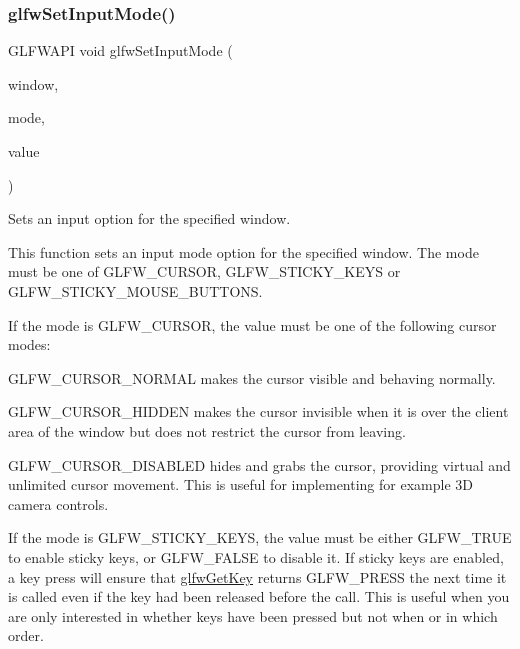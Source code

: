 \subsubsection{\texorpdfstring{glfw\+Set\+Input\+Mode()}{glfwSetInputMode()}}
{\footnotesize\ttfamily G\+L\+F\+W\+A\+PI void glfw\+Set\+Input\+Mode (\begin{DoxyParamCaption}\item[{\hyperlink{group__window_ga3c96d80d363e67d13a41b5d1821f3242}{G\+L\+F\+Wwindow} $\ast$}]{window,  }\item[{int}]{mode,  }\item[{int}]{value }\end{DoxyParamCaption})}



Sets an input option for the specified window. 

This function sets an input mode option for the specified window. The mode must be one of {\ttfamily G\+L\+F\+W\+\_\+\+C\+U\+R\+S\+OR}, {\ttfamily G\+L\+F\+W\+\_\+\+S\+T\+I\+C\+K\+Y\+\_\+\+K\+E\+YS} or {\ttfamily G\+L\+F\+W\+\_\+\+S\+T\+I\+C\+K\+Y\+\_\+\+M\+O\+U\+S\+E\+\_\+\+B\+U\+T\+T\+O\+NS}.

If the mode is {\ttfamily G\+L\+F\+W\+\_\+\+C\+U\+R\+S\+OR}, the value must be one of the following cursor modes\+:
\begin{DoxyItemize}
\item {\ttfamily G\+L\+F\+W\+\_\+\+C\+U\+R\+S\+O\+R\+\_\+\+N\+O\+R\+M\+AL} makes the cursor visible and behaving normally.
\item {\ttfamily G\+L\+F\+W\+\_\+\+C\+U\+R\+S\+O\+R\+\_\+\+H\+I\+D\+D\+EN} makes the cursor invisible when it is over the client area of the window but does not restrict the cursor from leaving.
\item {\ttfamily G\+L\+F\+W\+\_\+\+C\+U\+R\+S\+O\+R\+\_\+\+D\+I\+S\+A\+B\+L\+ED} hides and grabs the cursor, providing virtual and unlimited cursor movement. This is useful for implementing for example 3D camera controls.
\end{DoxyItemize}

If the mode is {\ttfamily G\+L\+F\+W\+\_\+\+S\+T\+I\+C\+K\+Y\+\_\+\+K\+E\+YS}, the value must be either {\ttfamily G\+L\+F\+W\+\_\+\+T\+R\+UE} to enable sticky keys, or {\ttfamily G\+L\+F\+W\+\_\+\+F\+A\+L\+SE} to disable it. If sticky keys are enabled, a key press will ensure that \hyperlink{group__input_ga7d8ad8ffaf272808f04e1d5d33ec8859}{glfw\+Get\+Key} returns {\ttfamily G\+L\+F\+W\+\_\+\+P\+R\+E\+SS} the next time it is called even if the key had been released before the call. This is useful when you are only interested in whether keys have been pressed but not when or in which order.

